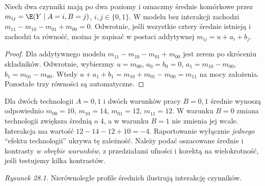 \begin{stwierdzenie}\label{prop:interaction-did}
Niech dwa czynniki mają po dwa poziomy i oznaczmy średnie komórkowe przez $m_{ij}=\E(Y\mid A=i,B=j)$, $i,j\in\{0,1\}$. W modelu bez interakcji zachodzi $m_{11}-m_{10}-m_{01}+m_{00}=0$. Odwrotnie, jeśli wszystkie cztery średnie istnieją i zachodzi ta równość, można je zapisać w postaci addytywnej $m_{ij}=u+a_i+b_j$.
\end{stwierdzenie}
\begin{proof}
Dla addytywnego modelu $m_{11}-m_{10}-m_{01}+m_{00}$ jest zerem po skróceniu składników. Odwrotnie, wybierzmy $u=m_{00}$, $a_0=b_0=0$, $a_1=m_{10}-m_{00}$, $b_1=m_{01}-m_{00}$. Wtedy $u+a_1+b_1=m_{10}+m_{01}-m_{00}=m_{11}$ na mocy założenia. Pozostałe trzy równości są automatyczne.
\end{proof}

\begin{przyklad}\label{ex:interaction-practical}
Dla dwóch technologii $A=0,1$ i dwóch warunków pracy $B=0,1$ średnie wynoszą odpowiednio $m_{00}=10$, $m_{10}=14$, $m_{01}=12$, $m_{11}=12$. W warunku $B=0$ zmiana technologii zwiększa średnią o $4$, a w warunku $B=1$ nie zmienia jej wcale. Interakcja ma wartość $12-14-12+10=-4$. Raportowanie wyłącznie \emph{jednego} ``efektu technologii'' ukrywa tę zależność. Należy podać oszacowane średnie i kontrasty \emph{w obrębie warunków}, z przedziałami ufności i korektą na wielokrotność, jeśli testujemy kilka kontrastów.
\end{przyklad}

\begin{center}

{\small\emph{Rysunek 28.1.} Nierównoległe profile średnich ilustrują interakcję czynników.}
\end{center}

